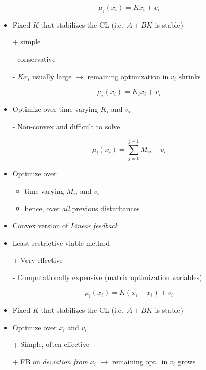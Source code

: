 \begin{equation*}
    \mu_i(x_i) = Kx_i + v_i
\end{equation*}
\begin{itemize}
    \item Fixed $K$ that stabilizes the CL (i.e.\ $A + BK$ is stable)
    \item [+] simple
    \item [-] conservative
    \item [-] $K x_i$ usually large $\rightarrow$ remaining optimization in $v_i$ shrinks
\end{itemize}

\newpar{}
\begin{equation*}
    \mu_i(x_i) = K_i x_i + v_i
\end{equation*}
\begin{itemize}
    \item Optimize over time-varying $K_i$  and $v_i$
    \item [-] Non-convex and difficult to solve
\end{itemize}

\newpar{}
\begin{equation*}
    \mu_i(x_i) = \sum_{j=0}^{j-1} M_{ij} + v_i
\end{equation*}
\begin{itemize}
    \item Optimize over
          \begin{itemize}
              \item time-varying $M_{ij}$ and $v_i$
              \item hence, over \textit{all} previous disturbances
          \end{itemize}
    \item Convex version of \textit{Linear feedback}
    \item Least restrictive viable method
    \item [+] Very effective
    \item [-] Computationally expensive (matrix optimization variables)
\end{itemize}

\newpar{}
\begin{equation*}
    \mu_i(x_i) = K(x_i - \bar{x}_i) + v_i
\end{equation*}
\begin{itemize}
    \item Fixed $K$ that stabilizes the CL (i.e.\ $A + BK$ is stable)
    \item Optimize over $\bar{x}_i$ and $v_i$
    \item [+] Simple, often effective
    \item [+] FB on \textit{deviation from} $x_i$ $\rightarrow$ remaining opt.\ in $v_i$ grows
\end{itemize}


